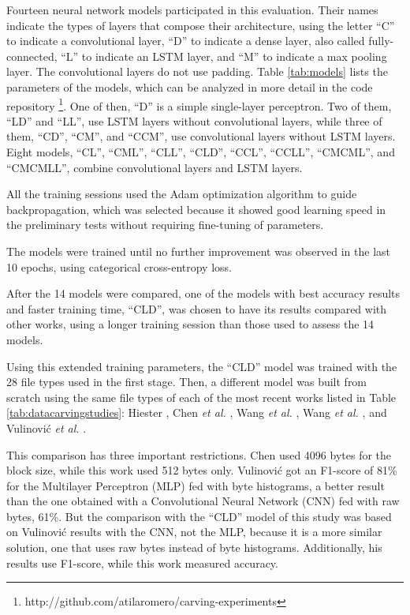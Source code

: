 Fourteen neural network models participated in this evaluation.
Their names indicate the types of layers that compose their architecture, using the letter ``C'' to indicate a convolutional layer, ``D'' to indicate a dense layer, also called fully-connected, ``L'' to indicate an LSTM layer, and ``M'' to indicate a max pooling layer. The convolutional layers do not use padding.
Table \ref{tab:models} lists the parameters of the models, which can be analyzed in more detail in the code repository \footnote{http://github.com/atilaromero/carving-experiments}. One of then, ``D'' is a simple single-layer perceptron. Two of them, ``LD'' and ``LL'', use LSTM layers without convolutional layers, while three of them, ``CD'', ``CM'', and ``CCM'', use convolutional layers without LSTM layers. Eight models, ``CL'', ``CML'', ``CLL'', ``CLD'', ``CCL'', ``CCLL'', ``CMCML'', and ``CMCMLL'', combine convolutional layers and LSTM layers. 



All the training sessions used the Adam \cite{kingma_adam:_2014}
optimization algorithm to guide backpropagation, which was selected because it showed good learning speed in the preliminary tests without requiring fine-tuning of parameters.

The models were trained until no further improvement was observed in the last 10 epochs, using categorical cross-entropy loss.

After the 14 models were compared, one of the models with best accuracy results and faster training time, ``CLD'', was chosen to have its results compared with other works, using a longer training session than those used to assess the 14 models.

Using this extended training parameters, the ``CLD'' model was trained with the 28 file types used in the first stage. Then, a different model was built from scratch using the same file types of each of the most recent works listed in Table \ref{tab:datacarvingstudies}: 
Hiester \cite{hiester_file_2018}, 
Chen \textit{et al.} \cite{chen_file_2018},
Wang \textit{et al.} \cite{wang_sparse_2018},
Wang \textit{et al.} \cite{wang_file_2018},
and
Vulinović \textit{et al.} \cite{vulinovic_neural_2019}.

This comparison has three important restrictions.
Chen used 4096 bytes for the block size, while this work used 512 bytes only.
Vulinović got an F1-score of 81\% for the Multilayer Perceptron (MLP) fed with byte histograms, a better result than the one obtained with a Convolutional Neural Network (CNN) fed with raw bytes, 61\%. But the comparison with the ``CLD'' model of this study was based on Vulinović results with the CNN, not the MLP, because it is a more similar solution, one that uses raw bytes instead of byte histograms. Additionally, his results use F1-score, while this work measured accuracy. 


